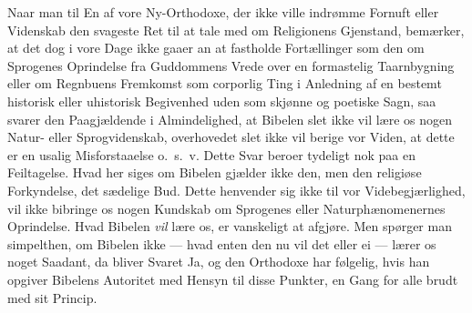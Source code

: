 Naar man til En af vore Ny-Orthodoxe, der ikke ville indrømme Fornuft eller
Videnskab den svageste Ret til at tale med om Religionens Gjenstand, bemærker,
at det dog i vore Dage ikke gaaer an at fastholde Fortællinger som den om
Sprogenes Oprindelse fra Guddommens Vrede over en formastelig Taarnbygning
eller om Regnbuens Fremkomst som corporlig Ting i Anledning af en bestemt
historisk
eller uhistorisk Begivenhed uden som skjønne og poetiske Sagn, saa
svarer den Paagjældende i Almindelighed, at Bibelen slet ikke vil lære os nogen
Natur- eller Sprogvidenskab, overhovedet slet ikke vil berige vor Viden, at
dette er en usalig Misforstaaelse o.\ s.\ v. Dette Svar beroer tydeligt nok
paa en Feiltagelse. Hvad her siges om Bibelen gjælder ikke den, men den
religiøse Forkyndelse, det sædelige Bud. Dette henvender sig ikke til vor
Videbegjærlighed, vil ikke bibringe os nogen Kundskab om Sprogenes eller
Naturphænomenernes Oprindelse. Hvad Bibelen \emph{vil} lære os, er vanskeligt
at afgjøre. Men spørger man simpelthen, om Bibelen ikke --- hvad enten den nu
vil det eller ei --- lærer os noget Saadant, da bliver Svaret Ja, og den
Orthodoxe har følgelig, hvis han opgiver Bibelens Autoritet med Hensyn til
disse Punkter, en Gang for alle brudt med sit Princip.

